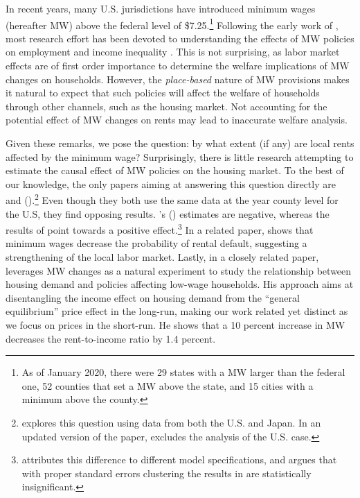 
In recent years, many U.S. jurisdictions have introduced minimum wages (hereafter MW) 
above the federal level of \$7.25.\footnote{As of January 2020, there were 29 states with 
	a MW larger than the federal one, 52 counties that set a MW above the state, and 15 
	cities with a minimum above the county.}
Following the early work of \textcite{CardKrueger2000}, most research effort has been 
devoted to understanding the effects of MW policies on 
employment \parencite[e.g.,][]{Neumark2006, DubeEtAl2010, MeerWest2016, CegnizEtAl2019} 
and income inequality \parencite{Lee1999, AutorEtAl2016}.
This is not surprising, as labor market effects are of first order importance to 
determine the welfare implications of MW changes on households. However, the 
\textit{place-based} nature of MW provisions makes it natural to expect that such 
policies will affect the welfare of households through other channels, such as the 
housing market.
Not accounting for the potential effect of MW changes on rents may lead to inaccurate 
welfare analysis.

Given these remarks, we pose the question: by what extent (if any) are local rents 
affected by the minimum wage? 
Surprisingly, there is little research attempting to estimate the causal effect of MW 
policies on the housing market. 
To the best of our knowledge, the only papers aiming at answering this question directly 
are \textcite{Tidemann2018} and \citeauthor{Yamagishi2019} (\citeyear{Yamagishi2019, 
Yamagishi2021}).\footnote{\textcite{Yamagishi2019} explores this question using data from 
	both the U.S. and Japan. In an updated version of the paper, \textcite{Yamagishi2021} 
	excludes the analysis of the U.S. case.}
Even though they both use the same data at the year county level for the U.S, they find 
opposing results. \citeauthor{Tidemann2018}'s (\citeyear{Tidemann2018}) estimates are 
negative, whereas the results of \textcite{Yamagishi2019} point towards a positive 
effect.\footnote{\textcite{Yamagishi2019} attributes this difference to different model 
	specifications, and argues that with proper standard errors clustering the results in 
	\textcite{Tidemann2018} are statistically insignificant.} 
In a related paper, \textcite{AgarwalEtAl2019} shows that minimum wages decrease the 
probability of rental default, suggesting a strengthening of the local labor market. 
Lastly, in a closely related paper, \textcite{Hughes2020} leverages MW changes as a 
natural experiment to study the relationship between housing demand and policies 
affecting low-wage households. 
His approach aims at disentangling the income effect on housing demand from the 
``general equilibrium'' price effect in the long-run, making our work related yet 
distinct as we focus on prices in the short-run. He shows that a 10 percent increase in 
MW decreases the rent-to-income ratio by 1.4 percent.

